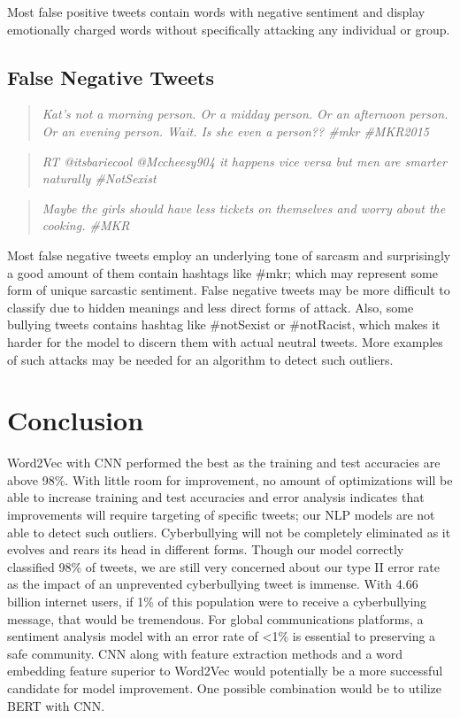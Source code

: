 \documentclass[conference]{IEEEtran}
\begin{document}
Most false positive tweets contain words with negative sentiment and display emotionally charged words without specifically attacking any individual or group.

\subsection{False Negative Tweets}
\begin{quotation}
\emph{Kat's not a morning person. Or a midday person. Or an afternoon person. Or an evening person. Wait. Is she even a person??  \#mkr \#MKR2015}
\end{quotation}
\begin{quotation}
\emph{RT @itsbariecool @Mccheesy904 it happens vice versa but men are smarter naturally \#NotSexist}
\end{quotation}
\begin{quotation}
\emph{Maybe the girls should have less tickets on themselves and worry about the cooking. \#MKR}
\end{quotation}

Most false negative tweets employ an underlying tone of sarcasm and surprisingly a good amount of them contain hashtags like \#mkr; which may represent some form of unique sarcastic sentiment. False negative tweets may be more difficult to classify due to hidden meanings and less direct forms of attack. Also, some bullying tweets contains hashtag like \#notSexist or \#notRacist, which makes it harder for the model to discern them with actual neutral tweets. More examples of such attacks may be needed for an algorithm to detect such outliers.

\section{Conclusion}

Word2Vec with CNN performed the best as the training and test accuracies are above 98\%. With little room for improvement, no amount of optimizations will be able to increase training and test accuracies and error analysis indicates that improvements will require targeting of specific tweets; our NLP models are not able to detect such outliers.
	Cyberbullying will not be completely eliminated as it evolves and rears its head in different forms. Though our model correctly classified 98\% of tweets, we are still very concerned about our type II error rate as the impact of an unprevented cyberbullying tweet is immense. With 4.66 billion internet users, if 1\% of this population were to receive a cyberbullying message, that would be tremendous. For global communications platforms, a sentiment analysis model with an error rate of <1\% is essential to preserving a safe community. CNN along with feature extraction methods and a word embedding feature superior to Word2Vec would potentially be a more successful candidate for model improvement. One possible combination would be to utilize BERT with CNN.
\end{document}
